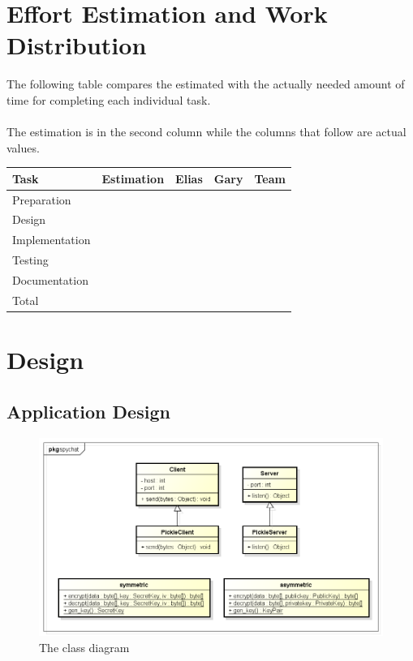 \documentclass[11pt, a4paper]{article}
\begin{document}
\section{Effort Estimation and Work Distribution}

The following table compares the estimated with the actually needed
amount of time for completing each individual task.
\\\\
The estimation is in the second column while the columns that follow
are actual values.

\parskip 12pt
\begin{tabular} {| l | c | c | c | c |}
	\hline
	Task					&	Estimation		& 	Elias 	& 	Gary 	& 	Team	\\ \hline \hline
	Preparation				&					&			&  			&			\\ \hline
	Design					&					&			&			&			\\ \hline
	Implementation			&					&			&			& 	 		\\ \hline
	Testing					&					&			& 			& 	 		\\ \hline
	Documentation			&					&			&			& 			\\ \hline 
	Total					&					&			&			& 			\\
	\hline
\end{tabular}

\newpage

\section{Design}
\label{sec:design}

\subsection{Application Design}

\begin{figure}[htbp]
  \centering
  \includegraphics[width=\linewidth]{img/class-diagram}
  \caption{The class diagram}
  \label{fig:class}
\end{figure}
\end{document}
